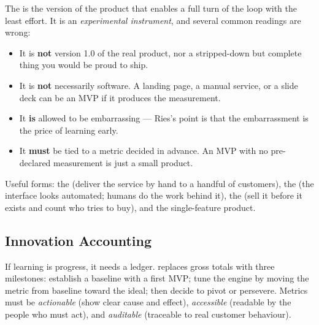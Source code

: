 \begin{cautionbox}
The  is the version of the product that enables a full turn of
the loop with the least effort. It is an \emph{experimental instrument}, and
several common readings are wrong:
\begin{itemize}
  \item It is \textbf{not} version 1.0 of the real product, nor a
    stripped-down but complete thing you would be proud to ship.
  \item It is \textbf{not} necessarily software. A landing page, a manual
    service, or a slide deck can be an MVP if it produces the measurement.
  \item It \textbf{is} allowed to be embarrassing --- Ries's point is that the
    embarrassment is the price of learning early.
  \item It \textbf{must} be tied to a metric decided in advance. An MVP with
    no pre-declared measurement is just a small product.
\end{itemize}
Useful forms: the  (deliver the service by hand to a
handful of customers), the  (the interface looks
automated; humans do the work behind it), the  (sell it
before it exists and count who tries to buy), and the single-feature product.
\end{cautionbox}

\subsection{Innovation Accounting}

If learning is progress, it needs a ledger. 
replaces gross totals with three milestones: establish a baseline with a first
MVP; tune the engine by moving the metric from baseline toward the ideal; then
decide to pivot or persevere. Metrics must be \emph{actionable} (show clear
cause and effect), \emph{accessible} (readable by the people who must act),
and \emph{auditable} (traceable to real customer behaviour).

